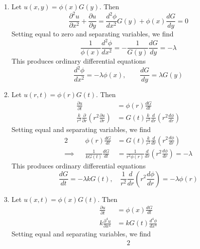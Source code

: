 \documentclass[a4paper]{article}
\begin{document}
\begin{enumerate}[label=(\alph*)]
\[		\frac{d G}{d t} = -\lambda k G \!\left( t \right), \qquad \frac{d^2 \phi}{d x^2} - \frac{v_{0}}{k}\frac{d \phi}{d x} = -\lambda \phi \!\left( x \right) 
	\]
	\item Let \( u \!\left( x,y \right) = \phi \!\left( x \right)G \!\left( y \right) \). Then
	\[
		\frac{\partial^2 u}{\partial x^2} + \frac{\partial u}{\partial y} = \frac{d^2 \phi}{d x^2}G \!\left( y \right) + \phi \!\left( x \right)\frac{d G}{d y} = 0 
	\]
	Setting equal to zero and separating variables, we find
	\[
		 \frac{1}{\phi \!\left( x \right)}\frac{d^2 \phi}{d x^2} = -\frac{1}{G \!\left( y \right)}\frac{d G}{d y} = -\lambda
	\]
	This produces ordinary differential equations
	\[
		\frac{d^2 \phi}{d x^2} = -\lambda \phi \!\left( x \right), \qquad \frac{d G}{d y} = \lambda G \!\left( y \right) 
	\]
	\item Let \( u \!\left( r,t \right) = \phi \!\left( r \right)G \!\left( t \right) \). Then 
	\begin{align*}
		\frac{\partial u}{\partial t} & = \phi \!\left( r \right)\frac{d G}{d t} \\
		\frac{k}{r^{2}}\frac{\partial }{\partial r}\!\left( r^{2}\frac{\partial u}{\partial r} \right) & = G \!\left( t \right)\frac{k}{r^{2}}\frac{d }{d r}\!\left( r^{2}\frac{d \phi}{d r} \right)
	\end{align*}
	Setting equal and separating variables, we find
	\begin{alignat*}{2}
		 && \phi \!\left( r \right)\frac{d G}{d t} & = G \!\left( t \right)\frac{k}{r^{2}}\frac{d }{d r}\!\left( r^{2}\frac{d \phi}{d r} \right) \\
		\implies && \frac{1}{kG \!\left( t \right)}\frac{d G}{d t} & = \frac{1}{r^{2}\phi \!\left( r \right)}\frac{d }{d r}\!\left( r^{2}\frac{d \phi}{d r} \right) = -\lambda
	\end{alignat*}
	This produces ordinary differential equations
	\[
		\frac{d G}{d t} = -\lambda k G \!\left( t \right), \quad \frac{1}{r^{2}}\frac{d }{d r}\!\left( r^{2}\frac{d \phi}{d r} \right) = -\lambda \phi \!\left( r \right)
	\]
	\item Let \( u \!\left( x,t \right) = \phi \!\left( x \right)G \!\left( t \right) \). Then 
	\begin{align*}
		\frac{\partial u}{\partial t} & = \phi \!\left( x \right)\frac{d G}{d t} \\
		k \frac{\partial^4 u}{\partial x^4} & = k G \!\left( t \right)\frac{d^4 \phi}{d x^4}
	\end{align*}
	Setting equal and separating variables, we find
	\begin{alignat*}{2}

\end{alignat*}
\end{enumerate}
\end{document}
